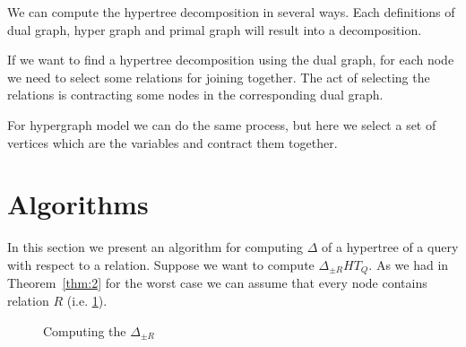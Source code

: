 \documentclass[12pt]{article}
\begin{document}
We can compute the hypertree decomposition in several ways. Each definitions of dual graph, hyper graph and primal graph will result into a decomposition.
\par
If we want to find a hypertree decomposition using the dual graph, for each node we need to select some relations for joining together. The act of selecting the relations is contracting some nodes in the corresponding dual graph. \\ \par
For hypergraph model we can do the same process, but here we select a set of vertices which are the variables and contract them together.
\section{Algorithms}
In this section we present an algorithm for computing  $\Delta$ of a hypertree of a query with respect to a relation.
Suppose we want to compute $\Delta_{\pm R}{HT_{Q}}$. As we had in Theorem~\ref{thm:2} for the worst case we can assume that every node contains relation $R$ (i.e. \ref{fig3}).
\begin{figure}[htbp]
\begin{center}
\usetikzlibrary{fit}
\end{center}
\caption{Computing the $\Delta_{\pm R}$}
\label{fig3}
\end{figure}
\end{document}
